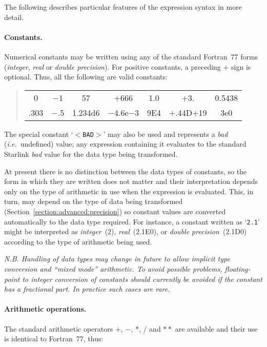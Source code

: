 \documentclass[twoside,11pt]{article}
\begin{document}
The following describes particular features of the expression syntax in more
detail. 

\paragraph{Constants.}
Numerical constants may be written using any of the standard Fortran~77
forms (\emph{integer}, \emph{real} or \emph{double precision}). 
For positive constants, a preceding $+$ sign is optional.
Thus, all the following are valid constants: 

\begin{quote}
\begin{center}
\begin{tabular}{ccccccc}

0 & $-$1 & 57 & $+$666 & 1.0 & $+$3. & 0.5438 \\
.303 & $-$.5 & 1.234d6 & $-$4.6e$-$3 & 9E4 & $+$.44D$+$19 & 3e0\\

\end{tabular}
\end{center}
\end{quote}

The special constant `$<$\verb#BAD#$>$' may also be used and represents a
\emph{bad} (\emph{i.e.}\ undefined) value; any expression containing it
evaluates to the standard Starlink \emph{bad} value for the data type being
transformed. 

At present there is no distinction between the data types of constants, so
the form in which they are written does not matter and their interpretation
depends only on the type of arithmetic in use when the expression is
evaluated. 
This, in turn, may depend on the type of data being transformed
(Section~\ref{section:advanced:precision}) so constant values are converted
automatically to the data type required. 
For instance, a constant written as `\mbox{\texttt{2.1}}' might be interpreted as
\emph{integer}~(2), \emph{real}~(2.1E0), or \emph{double precision}~(2.1D0)
according to the type of arithmetic being used. 

\emph{N.B. Handling of data types may change in future to allow implicit type
conversion and ``mixed mode'' arithmetic. 
To avoid possible problems, floating-point to integer conversion of
constants should currently be avoided if the constant has a fractional part.
In practice such cases are rare.}

\paragraph{Arithmetic operations.}
The standard arithmetic operators $+$, $-$, $*$, $/$ and $**$ are available
and their use is identical to Fortran~77, thus: 
\end{document}
